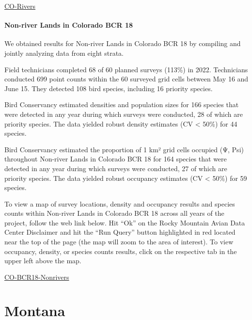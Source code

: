 \documentclass[
  letterpaper,
  DIV=11,
  numbers=noendperiod,
  oneside]{scrreprt}
\begin{document}
\href{http://www.rmbo.org/new_site/adc/QueryWindow.aspx\#N4IgzgrgDgpgTmALnAhoiBbEAuABCAYQHkBaAJQEsA3eMEAXyA==}{CO-Rivers}

\hypertarget{non-river-lands-in-colorado-bcr-18}{%
\subsubsection{Non-river Lands in Colorado BCR
18}\label{non-river-lands-in-colorado-bcr-18}}

We obtained results for Non-river Lands in Colorado BCR 18 by compiling
and jointly analyzing data from eight strata.

Field technicians completed 68 of 60 planned surveys (113\%) in 2022.
Technicians conducted 699 point counts within the 60 surveyed grid cells
between May 16 and June 15. They detected 108 bird species, including 16
priority species.

Bird Conservancy estimated densities and population sizes for 166
species that were detected in any year during which surveys were
conducted, 28 of which are priority species. The data yielded robust
density estimates (CV \textless{} 50\%) for 44 species.

Bird Conservancy estimated the proportion of 1 km² grid cells occupied
(Ψ, Psi) throughout Non-river Lands in Colorado BCR 18 for 164 species
that were detected in any year during which surveys were conducted, 27
of which are priority species. The data yielded robust occupancy
estimates (CV \textless{} 50\%) for 59 species.

To view a map of survey locations, density and occupancy results and
species counts within Non-river Lands in Colorado BCR 18 across all
years of the project, follow the web link below. Hit ``Ok'' on the Rocky
Mountain Avian Data Center Disclaimer and hit the ``Run Query'' button
highlighted in red located near the top of the page (the map will zoom
to the area of interest). To view occupancy, density, or species counts
results, click on the respective tab in the upper left above the map.

\href{http://www.rmbo.org/new_site/adc/QueryWindow.aspx\#N4IgzgrgDgpgTmALnAhoiBbEAuABCAYQHkBaAIQICUBGADhIDkB7AOzgEsA3eMEAXyA=}{CO-BCR18-Nonrivers}

\hypertarget{montana}{%
\chapter{Montana}\label{montana}}
\end{document}
